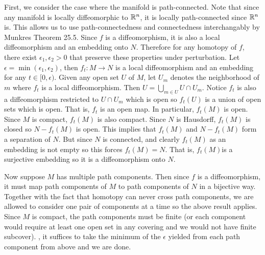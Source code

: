 \documentclass[12pt]{article}
\begin{document}
\begin{problem}[1.6.8]
	First, we consider the case where the manifold is path-connected. Note that since any manifold is locally diffeomorphic to $ \mathbb{R}^{n}$, it is locally path-connected since $ \mathbb{R}^{n}$ is. This allows us to use path-connectedness and connectedness interchangably by Munkres Theorem 25.5. Since $ f$ is a diffeomorphism, it is also a local diffeomorphism and an embedding onto  $ N$. Therefore for any homotopy of $ f$, there exist  $ \epsilon_1, \epsilon_2>0$ that preserve these properties under perturbation. Let $ \epsilon= \min( \epsilon_1, \epsilon_2)$, then $ f_t:M \to N$ is a local diffeomorphism and an embedding for any $ t \in [0, \epsilon)$. Given any open set $ U$ of $ M$, let  $ U_m$ denotes the neighborhood of  $ m$ where  $ f_t$ is a local diffeomorphism. Then  $ U=\bigcup_{ m \in U} U \cap U_m$. Notice $ f_t$ is also a diffeomorphism restricted to  $ U \cap U_m$ which is open so $ f_t(U)$ is a union of open sets which is open. That is,  $ f_t$ is an open map. In particular,  $ f_t(M)$ is open. Since $ M$ is compact,  $ f_t(M)$ is also compact. Since  $ N$ is Hausdorff,  $ f_t(M)$ is closed so $ N-f_t(M)$ is open. This implies that $ f_t(M)$ and $ N- f_t(M)$ form a separation of  $ N$. But since $ N$ is connected, and clearly $ f_t(M)$ as an embedding is not empty so this forces $ f_t(M) = N$. That is, $ f_t(M)$is a surjective embedding so it is a diffeomorphism onto  $ N$.

	Now suppose  $ M$ has multiple path components. Then since $ f$ is a diffeomorphism, it must map path components of  $ M$ to path components of  $ N$ in a bijective way. Together with the fact that homotopy can never cross path components, we are allowed to consider one pair of components at a time so the above result applies. Since $ M$ is compact, the path components must be finite (or each component would require at least one open set in any covering and we would not have finite subcover). , it suffices to take the minimum of the $ \epsilon$ yielded from each path component from above and we are done.
\end{problem}
\end{document}
